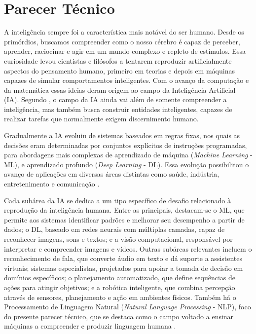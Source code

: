 \chapter{Parecer Técnico} \label{cha:parecertecnico}

A inteligência sempre foi a característica mais notável do ser humano. Desde os primórdios, buscamos compreender como o nosso cérebro é capaz de perceber, aprender, raciocinar e agir em um mundo complexo e repleto de estímulos. Essa curiosidade levou cientistas e filósofos a tentarem reproduzir artificialmente aspectos do pensamento humano, primeiro em teorias e depois em máquinas capazes de simular comportamentos inteligentes. Com o avanço da computação e da matemática essas ideias deram origem ao campo da Inteligência Artificial (IA). Segundo \textcite{russell2022}, o campo da IA ainda vai além de somente compreender a inteligência, mas também busca construir entidades inteligentes, capazes de realizar tarefas que normalmente exigem discernimento humano.

Gradualmente a IA evoluiu de sistemas baseados em regras fixas, nos quais as decisões eram determinadas por conjuntos explícitos de instruções programadas, para abordagens mais complexas de aprendizado de máquina (\textit{Machine Learning} - ML), e aprendizado profundo (\textit{Deep Learning} - DL). Essa evolução possibilitou o avanço de aplicações em diversas áreas distintas como saúde, indústria, entretenimento e comunicação \cite{nilsson2010quest}.

Cada subárea da IA se dedica a um tipo específico de desafio relacionado à reprodução da inteligência humana. Entre as principais, destacam-se o ML, que permite aos sistemas identificar padrões e melhorar seu desempenho a partir de dados; o DL, baseado em redes neurais com múltiplas camadas, capaz de reconhecer imagens, sons e textos; e a visão computacional, responsável por interpretar e compreender imagens e vídeos.
Outras subáreas relevantes incluem o reconhecimento de fala, que converte áudio em texto e dá suporte a assistentes virtuais; sistemas especialistas, projetados para apoiar a tomada de decisão em domínios específicos; o planejamento automatizado, que define sequências de ações para atingir objetivos; e a robótica inteligente, que combina percepção através de sensores, planejamento e ação em ambientes físicos.
Também há o Processamento de Linguagem Natural (\textit{Natural Language Processing} - NLP), foco do presente parecer técnico, que se destaca como o campo voltado a ensinar máquinas a compreender e produzir linguagem humana \cite{russell2022}.

